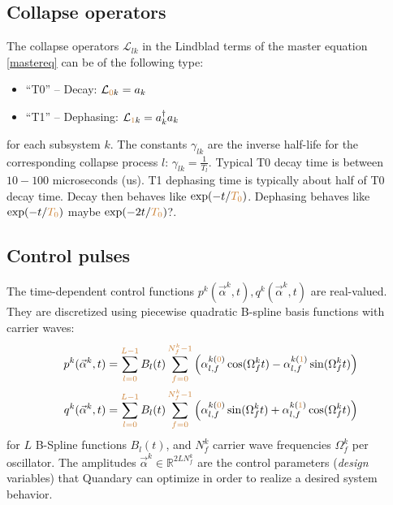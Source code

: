 \documentclass[letterpaper]{article}
\newcommand{\YC}[1]{{\textcolor{Bronze}{#1}}}
\newcommand{\Ell}{\mathcal{L}}
\newcommand{\R}{\mathds{R}}
\begin{document}
\subsection{Collapse operators}
The collapse operators $\Ell_{lk}$ in the Lindblad terms of the master equation
\eqref{mastereq} can be of the following type:
\begin{itemize}
  \item ``T\YC{0}'' -- Decay: $\Ell_{\YC{0}k} = a_k$
  \item ``T\YC{1}'' -- Dephasing: $\Ell_{\YC{1}k} = a_k^{\dagger}a_k$
\end{itemize}
for each subsystem $k$. The constants $\gamma_{lk}$ are the inverse half-life
for the corresponding collapse process $l$: $\gamma_{lk} = {\frac{1}{T_l}}$.
Typical \YC{T0} decay time is between $10-100$ microseconds (us). \YC{T1}
dephasing time is typically about half of \YC{T0} decay time. Decay then behaves
like $\exp(-t/{\YC{T_0}})$. Dephasing behaves like $\exp(- t / \YC{T_0})$ \YC{maybe
$\exp(-2t / \YC{T_0})$?}.

\subsection{Control pulses} \label{subsec:controlpulses}
The time-dependent control functions $p^k(\vec{\alpha}^k,t),
q^k(\vec{\alpha}^k,t)$ are real-valued. They are discretized using piecewise quadratic B-spline basis functions with
carrier waves: 
\begin{align}
  p^k(\vec{\alpha}^k,t) &= \sum_{\YC{l=0}}^{\YC{L-1}} B_l(t)
  \sum_{\YC{f=0}}^{\YC{N_f^k-1}} \left(\alpha^{k
  (\YC{0})}_{l,f} \cos(\Omega_f^k t) - \alpha^{k (\YC{1})}_{l,f} \sin(\Omega_f^k t)
  \right) \\
  q^k(\vec{\alpha}^k,t) &= \sum_{\YC{l=0}}^{\YC{L-1}} B_l(t)
  \sum_{\YC{f=0}}^{\YC{N_f^k-1}} \left( \alpha^{k
  (\YC{0})}_{l,f} \sin(\Omega_f^k t) + \alpha^{k (\YC{1})}_{l,f} \cos(\Omega_f^k t)
  \right)
\end{align}
for $L$ B-Spline functions $B_l(t)$, and $N_f^k$ carrier wave frequencies
$\Omega_f^k$ per oscillator. The amplitudes $\vec{\alpha}^k \in \R^{2LN_f^k}$ are the control
parameters (\textit{design} variables) that Quandary can optimize in order to realize a
desired system behavior. 
\end{document}
